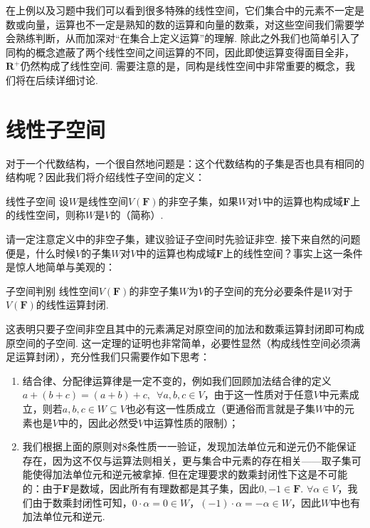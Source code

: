 在上例以及习题中我们可以看到很多特殊的线性空间，它们集合中的元素不一定是数或向量，运算也不一定是熟知的数的运算和向量的数乘，对这些空间我们需要学会熟练判断，从而加深对``在集合上定义运算''的理解. 除此之外我们也简单引入了同构的概念遮蔽了两个线性空间之间运算的不同，因此即使运算变得面目全非，$\mathbf{R}^+$仍然构成了线性空间. 需要注意的是，同构是线性空间中非常重要的概念，我们将在后续详细讨论.

\section{线性子空间}

对于一个代数结构，一个很自然地问题是：这个代数结构的子集是否也具有相同的结构呢？因此我们将介绍线性子空间的定义：
\begin{definition}{线性子空间}{} 
    设$W$是线性空间$V(\mathbf{F})$的非空子集，如果$W$对$V$中的运算也构成域$\mathbf{F}$上的线性空间，则称$W$是$V$的（简称）.
\end{definition}

请一定注意定义中的非空子集，建议验证子空间时先验证非空. 接下来自然的问题便是，什么时候$V$的子集$W$对$V$中的运算也构成域$\mathbf{F}$上的线性空间？事实上这一条件是惊人地简单与美观的：
\begin{theorem}{}{子空间判别}
    线性空间$V(\mathbf{F})$的非空子集$W$为$V$的子空间的充分必要条件是$W$对于$V(\mathbf{F})$的线性运算封闭.
\end{theorem}

这表明只要子空间非空且其中的元素满足对原空间的加法和数乘运算封闭即可构成原空间的子空间. 这一定理的证明也非常简单，必要性显然（构成线性空间必须满足运算封闭），充分性我们只需要作如下思考：
\begin{enumerate}
    \item 结合律、分配律运算律是一定不变的，例如我们回顾加法结合律的定义$a+(b+c)=(a+b)+c,\enspace\forall a,b,c\in V$，由于这一性质对于任意$V$中元素成立，则若$a,b,c\in W\subseteq V$也必有这一性质成立（更通俗而言就是子集$W$中的元素也是$V$中的，因此必然受$V$中运算性质的限制）；

    \item 我们根据上面的原则对8条性质一一验证，发现加法单位元和逆元仍不能保证存在，因为这不仅与运算法则相关，更与集合中元素的存在相关——取子集可能使得加法单位元和逆元被拿掉. 但在定理要求的数乘封闭性下这是不可能的：由于$\mathbf{F}$是数域，因此所有有理数都是其子集，因此$0,-1\in\mathbf{F}$. $\forall \alpha\in V$，我们由于数乘封闭性可知，$0\cdot\alpha=0\in W$，$(-1)\cdot\alpha=-\alpha\in W$，因此$W$中也有加法单位元和逆元.
\end{enumerate}

